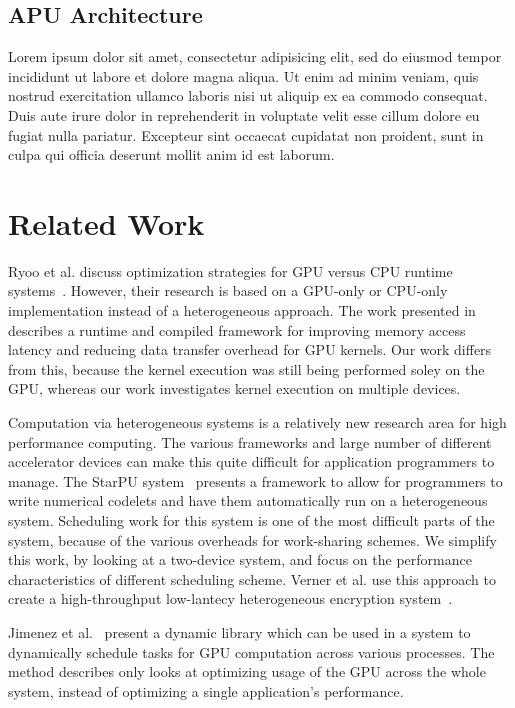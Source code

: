 \documentclass[journal]{IEEEtran}
\begin{document}
\subsection{APU Architecture}
Lorem ipsum dolor sit amet, consectetur adipisicing elit, sed do
eiusmod tempor incididunt ut labore et dolore magna aliqua. Ut
enim ad minim veniam, quis nostrud exercitation ullamco laboris
nisi ut aliquip ex ea commodo consequat. Duis aute irure dolor
in reprehenderit in voluptate velit esse cillum dolore eu fugiat
nulla pariatur. Excepteur sint occaecat cupidatat non proident,
sunt in culpa qui officia deserunt mollit anim id est laborum.

\section{Related Work}
Ryoo et al. discuss optimization strategies for GPU versus CPU runtime
systems~\cite{Ryoo2007}.  However, their research is based on a GPU-only
or CPU-only implementation instead of a heterogeneous approach.  The work
presented in ~\cite{Jablin2011} describes a runtime and compiled framework
for improving memory access latency and reducing data transfer overhead
for GPU kernels.  Our work differs from this, because the kernel execution
was still being performed soley on the GPU, whereas our work investigates
kernel execution on multiple devices.

Computation via heterogeneous systems is a relatively new research area for
high performance computing.  The various frameworks and large number of
different accelerator devices can make this quite difficult for application
programmers to manage.  The StarPU system~\cite{Augonnet2009} presents a 
framework to allow for programmers to write numerical codelets and have them
automatically run on a heterogeneous system.  Scheduling work for this system
is one of the most difficult parts of the system, because of the various
overheads for work-sharing schemes. We simplify this work, by looking at a
two-device system, and focus on the performance characteristics of different
scheduling scheme.  Verner et al. use this approach to create a high-throughput
low-lantecy heterogeneous encryption system~\cite{Verner2011}. 

Jimenez et al.~\cite{Jimenez2009} present a dynamic library which can be used
in a system to dynamically schedule tasks for GPU computation across various
processes. The method describes only looks at optimizing usage of the GPU across
the whole system, instead of optimizing a single application's performance.
\end{document}
